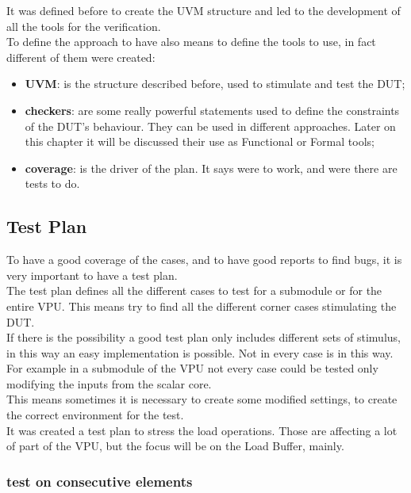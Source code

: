 It was defined before to create the UVM structure and led to the development of all the tools for the verification. \\
To define the approach to have also means to define the tools to use, in fact different of them were created:
\begin{itemize}
    \item \textbf{UVM}: is the structure described before, used to stimulate and test the DUT;
    
    \item \textbf{checkers}: are some really powerful statements used to define the constraints of the DUT's behaviour. They can be used in different approaches. Later on this chapter it will be discussed their use as Functional or Formal tools;
    
    \item \textbf{coverage}: is the driver of the plan. It says were to work, and were there are tests to do. 
    
\end{itemize}
\subsection{Test Plan}
To have a good coverage of the cases, and to have good reports to find bugs, it is very important to have a test plan.\\

The test plan defines all the different cases to test for a submodule or for the entire VPU. This means try to find all the different corner cases stimulating the DUT.\\

If there is the possibility a good test plan only includes different sets of stimulus, in this way an easy implementation is possible. Not in every case is in this way. For example in a submodule of the VPU not every case could be tested only modifying the inputs from the scalar core.\\
This means sometimes it is necessary to create some modified settings, to create the correct environment for the test.\\

It was created a test plan to stress the load operations. Those are affecting a lot of part of the VPU, but the focus will be on the Load Buffer, mainly.\\

\subsubsection{test on consecutive elements}


